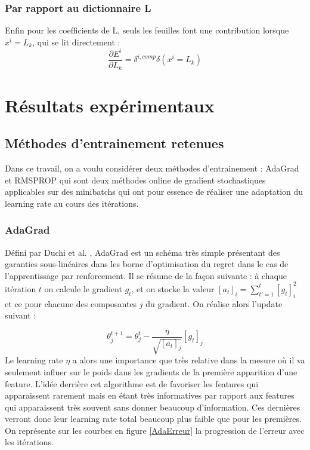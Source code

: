 \documentclass[conference]{IEEEtran}
\begin{document}
\subsubsection{Par rapport au dictionnaire L}
Enfin pour les coefficients de L, seuls les feuilles font une contribution lorsque $x^i=L_k$, qui se lit directement :
$$\frac{\partial E^i}{\partial L_k} = \delta^{i,comp}\delta(x^i=L_k)$$

\section{Résultats expérimentaux}
\subsection{Méthodes d'entrainement retenues}
Dans ce travail, on a voulu considérer deux méthodes d'entrainement : AdaGrad et RMSPROP qui sont deux méthodes online de gradient stochastiques applicables sur des minibatchs qui ont pour essence de réaliser une adaptation du learning rate au cours des itérations.

\subsubsection{AdaGrad}
Défini par Duchi et al. \cite{Duchi:2011:ASM:1953048.2021068}, AdaGrad est un schéma très simple présentant des garanties sous-linéaires dans les borne d'optimisation du regret dans le cas de l'apprentissage par renforcement. Il se résume de la façon suivante : à chaque itération $t$ on calcule le gradient $g_t$, et on stocke la valeur $[a_t]_i=\sum_{t'=1}^t [g_t]_i^2$ et ce pour chacune des composantes $j$ du gradient. On réalise alors l'update suivant :

$$\theta^{t+1}_j=\theta^{t}_j-\frac{\eta}{\sqrt{[a_t]_j}}[g_t]_j$$
Le learning rate $\eta$ a alors une importance que très relative dans la mesure où il va seulement influer sur le poids dans les gradients de la première apparition d'une feature. L'idée derrière cet algorithme est de favoriser les features qui apparaissent rarement mais en étant très informatives par rapport aux features qui apparaissent très souvent sans donner beaucoup d'information. Ces dernières verront donc leur learning rate total beaucoup plus faible que pour les premières. On représente sur les courbes en figure \ref{AdaErreur} la progression de l'erreur avec les itérations.
\end{document}

